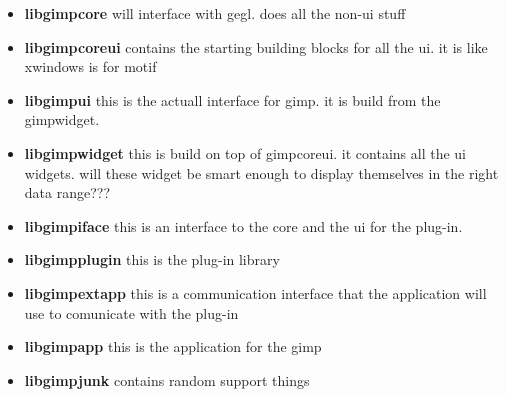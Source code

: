 
\begin{itemize}
\item {\bf libgimpcore} will interface with gegl. does all the non-ui stuff
\item {\bf libgimpcoreui} contains the starting building blocks for all the ui. it
is like xwindows is for motif
\item {\bf libgimpui} this is the actuall interface for gimp. it is build from
the gimpwidget. 
\item {\bf libgimpwidget} this is build on top of gimpcoreui. it contains all the
ui widgets. will these widget be smart enough to display themselves in the
right data range???
\item {\bf libgimpiface} this is an interface to the core and the ui for the
plug-in.
\item {\bf libgimpplugin} this is the plug-in library
\item {\bf libgimpextapp} this is a communication interface that the application
will use to comunicate with the plug-in
\item {\bf libgimpapp} this is the application for the gimp
\item {\bf libgimpjunk} contains random support things
\end{itemize}

